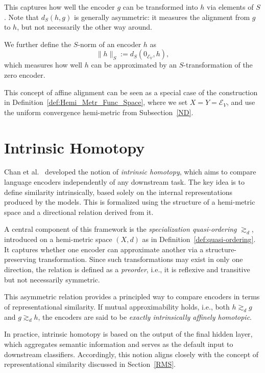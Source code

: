 This captures how well the encoder \( g \) can be transformed into \( h \) via elements of \( S \). 
Note that \( d_S(h, g) \) is generally asymmetric: it measures the alignment from \( g \) to \( h \), but not necessarily the other way around.

We further define the \( S \)-norm of an encoder \( h \) as
\[
\| h \|_S := d_S(0_{\mathcal{E}_V}, h),
\]
which measures how well \( h \) can be approximated by an \( S \)-transformation of the zero encoder.

\medskip

This concept of affine alignment can be seen as a special case of the construction in Definition~\ref{def:Hemi_Metr_Func_Space}, where we set \( X = Y = \mathcal{E}_V \), and use the uniform convergence hemi-metric from Subsection~\ref{ND}.









\section{Intrinsic Homotopy}\label{IH}
Chan et al.~\cite{chan_affine_2024} developed the notion of \emph{intrinsic homotopy}, which aims to compare language encoders independently of any downstream task.  
The key idea is to define similarity intrinsically, based solely on the internal representations produced by the models.  
This is formalized using the structure of a hemi-metric space and a directional relation derived from it.

A central component of this framework is the \emph{specialization quasi-ordering} \( \gtrsim_d \), introduced on a hemi-metric space \( (X, d) \) as in Definition~\ref{def:quasi-ordering}.  
It captures whether one encoder can approximate another via a structure-preserving transformation.  
Since such transformations may exist in only one direction, the relation is defined as a \emph{preorder}, i.e., it is reflexive and transitive but not necessarily symmetric.

This asymmetric relation provides a principled way to compare encoders in terms of representational similarity.  
If mutual approximability holds, i.e., both \( h \gtrsim_d g \) and \( g \gtrsim_d h \), the encoders are said to be \emph{exactly intrinsically affinely homotopic}.

In practice, intrinsic homotopy is based on the output of the final hidden layer, which aggregates semantic information and serves as the default input to downstream classifiers.  
Accordingly, this notion aligns closely with the concept of representational similarity discussed in Section~\ref{RMS}.

